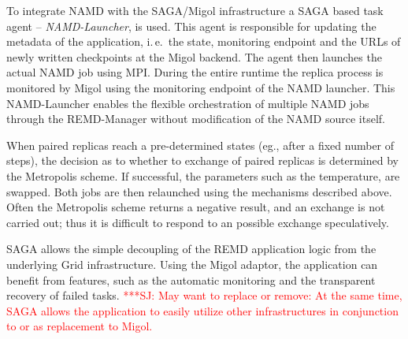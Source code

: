 \documentclass[times, 10pt, twocolumn]{article}
\newcommand{\jhanote}[1]{ {\textcolor{red} { ***SJ: #1 }}}
\newcommand{\jhanote}[1]{}
\begin{document}
To integrate NAMD with the SAGA/Migol infrastructure a SAGA based task
agent -- {\it NAMD-Launcher}, is used.  This agent is responsible for
updating the metadata of the application, i.\,e.\ the state,
monitoring endpoint and the URLs of newly written checkpoints at the
Migol backend.  The agent then launches the actual NAMD job using
MPI. During the entire runtime the replica process is monitored by
Migol using the monitoring endpoint of the NAMD launcher. This
NAMD-Launcher enables the flexible orchestration of multiple NAMD jobs
through the REMD-Manager without modification of the NAMD source
itself.


When paired replicas reach a pre-determined states (eg., after a fixed
number of steps), the decision as to whether to exchange of paired
replicas is determined by the Metropolis scheme. If successful, the
parameters such as the temperature, are swapped. Both jobs are then
relaunched using the mechanisms described above. Often the Metropolis
scheme returns a negative result, and an exchange is not carried out; thus
it is difficult to respond to an possible exchange speculatively.

SAGA allows the simple decoupling of the REMD application logic from
the underlying Grid infrastructure. Using the Migol adaptor, the
application can benefit from features, such as the automatic
monitoring and the transparent recovery of failed tasks.  \jhanote{May
  want to replace or remove: At the same time, SAGA allows the
  application to easily utilize other infrastructures in conjunction
  to or as replacement to Migol.}


                                             
\end{document}
